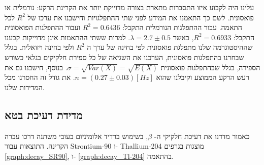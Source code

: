 \documentclass{article}
\begin{document}
עלינו היה לקבוע איזו התסברות מתארת בצורה מדוייקת יותר את הקרינת הרקע: נורמלית או פואסונית.
לשם כך התאמנו את המידע לפני שתי ההתפלגויות וחישבנו את ערכו של 
$R^2$
לכל התאמה.
עבור ההתפלגות הנורמלית התקבל:
$R^2 = 0.6436$
ועבור ההתפלגות הפואסונית התקבל:
$R^2 = 0.6933$,
כאשר
$\lambda = 2.7 \pm 0.5$.
למרות ששתי ההתאמות אינן מדוייקות קבענו שההיסטוגרמה שלנו מתפלגת פואסונית לפי בחינה של ערך ה 
$R^2$
ולפי בחינה ויזואלית. בגלל שבחרנו בהתפלגות פואסונית, הערכנו את השגיאה של כל ספירת חלקיקים בגלאי כשורש הספירה, בגלל שבהתפלגות פואסונית
$\sigma = \sqrt{Var(X)} = \sqrt{E(X)}$.
בנוסף, חישבנו גם את רעש הרקע הממוצע וקיבלנו שהוא
$n = (0.27\pm0.03) [Hz]$.
את גודל זה החסרנו מכל המדידות שלנו.

\subsection{
מדידת דעיכת בטא
}

כאמור מדדנו את דעיכת חלקיקי ה-
$\beta$,
בשימוש 
ברדיד אלומיניום בעובי משתנה דרכו עברה הקרינה. התוצאות עבור
\textenglish{Strontium-90}
ו-
\textenglish{Thallium-204}
מוצגות בגרפים 
\ref{graph:decay_SR90},
ו-
\ref{graph:decay_Tl-204}
בהתאמה.
\end{document}
